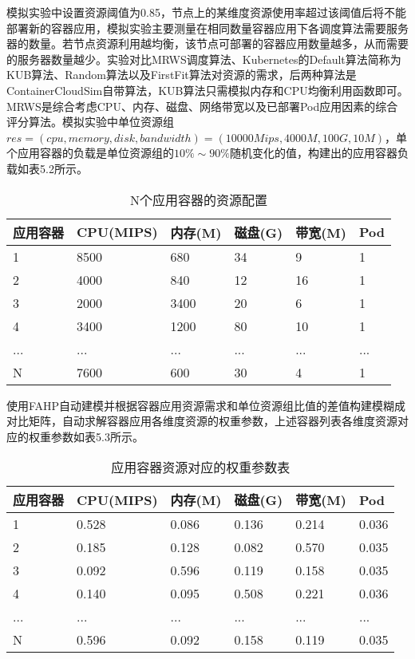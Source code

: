 模拟实验中设置资源阈值为0.85，节点上的某维度资源使用率超过该阈值后将不能部署新的容器应用，模拟实验主要测量在相同数量容器应用下各调度算法需要服务器的数量。若节点资源利用越均衡，该节点可部署的容器应用数量越多，从而需要的服务器数量越少。实验对比MRWS调度算法、Kubernetes的Default算法简称为KUB算法、Random算法以及FirstFit算法对资源的需求，后两种算法是ContainerCloudSim自带算法，KUB算法只需模拟内存和CPU均衡利用函数即可。MRWS是综合考虑CPU、内存、磁盘、网络带宽以及已部署Pod应用因素的综合评分算法。模拟实验中单位资源组$res=(cpu,memory,disk,bandwidth)=(10000Mips,4000M,100G,10M)$，单个应用容器的负载是单位资源组的$10\%\sim 90\%$随机变化的值，构建出的应用容器负载如表5.2所示。
\begin{table}[H]
	\centering\dawu[1.3]
	\caption{N个应用容器的资源配置}
	\begin{tabular}{|p{1.8cm}<{\centering}|p{1.8cm}<{\centering}|p{1.8cm}<{\centering}|p{1.8cm}<{\centering}|p{1.8cm}<{\centering}|p{1.8cm}<{\centering}|} \hline
		应用容器 & CPU(MIPS) & 内存(M) & 磁盘(G) & 带宽(M) & Pod \\ \hline
		 1 & 8500 & 680 & 34 & 9 &1 \\ \hline
		 2 & 4000 & 840 & 12 & 16 & 1 \\ \hline
		 3 & 2000 & 3400 & 20 & 6 & 1 \\ \hline
		 4 & 3400 & 1200 & 80 & 10 & 1 \\ \hline
		 ... & ... & ... & ... & ... & ... \\ \hline
		 N & 7600 & 600 & 30 & 4 & 1 \\ \hline
	\end{tabular}
\end{table}
使用FAHP自动建模并根据容器应用资源需求和单位资源组比值的差值构建模糊成对比矩阵，自动求解容器应用各维度资源的权重参数，上述容器列表各维度资源对应的权重参数如表5.3所示。
\begin{table}[H]
	\centering\dawu[1.3]
	\caption{应用容器资源对应的权重参数表}
	\begin{tabular}{|p{1.8cm}<{\centering}|p{1.8cm}<{\centering}|p{1.8cm}<{\centering}|p{1.8cm}<{\centering}|p{1.8cm}<{\centering}|p{1.8cm}<{\centering}|} \hline
		应用容器 & CPU(MIPS) & 内存(M) & 磁盘(G) & 带宽(M) & Pod \\ \hline
		 1 & 0.528 & 0.086 & 0.136 & 0.214 & 0.036 \\ \hline
		 2 & 0.185 & 0.128 & 0.082 & 0.570 & 0.035 \\ \hline
		 3 & 0.092 & 0.596 & 0.119 & 0.158 & 0.035 \\ \hline
		 4 & 0.140 & 0.095 & 0.508 & 0.221 & 0.036 \\ \hline
		 ... & ... & ... & ... & ... & ... \\ \hline
		 N & 0.596 & 0.092 & 0.158 & 0.119 & 0.035 \\ \hline
	\end{tabular}
\end{table}
